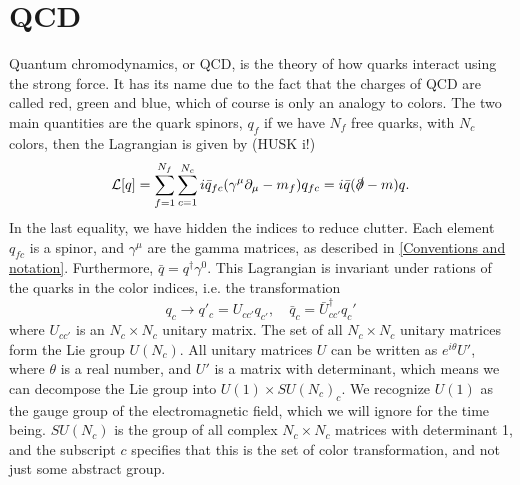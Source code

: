 \section{QCD}

Quantum chromodynamics, or QCD, is the theory of how quarks interact using the strong force.
It has its name due to the fact that the charges of QCD are called red, green and blue, which of course is only an analogy to colors.
The two main quantities are the quark spinors, $q_f$
if we have $N_f$ free quarks, with $N_c$ colors, then the Lagrangian is given by (HUSK i!)
\begin{equation}
    \mathcal{L}[q] = \sum_{f=1}^{N_f} \sum_{c = 1}^{N_c} i \bar q_{fc} (\gamma^\mu \partial_\mu - m_f )q_{fc}
    = i  \bar q (\slashed{\partial } - m)q.
\end{equation}
In the last equality, we have hidden the indices to reduce clutter.
Each element $q_{fc}$ is a spinor, and $\gamma^\mu$ are the gamma matrices, as described in \autoref{Conventions and notation}.
Furthermore, $\bar q = q^\dagger \gamma^0$.
This Lagrangian is invariant under rations of the quarks in the color indices,
i.e. the transformation
\begin{equation}
    q_c \rightarrow q'_c = U_{cc'} q_{c'},
    \quad 
    \bar q_c = \bar U_{cc'}^\dagger q_c'
\end{equation}
where $U_{cc'}$ is an $N_c \times N_c$ unitary matrix.
The set of all $N_c\times N_c$ unitary matrices form the Lie group $U(N_c)$.
All unitary matrices $U$ can be written as $e^{i\theta} U'$, where $\theta$ is a real number, and $U'$ is a matrix with determinant, which means we can decompose the Lie group into $U(1)\times SU(N_c)_c$.
We recognize $U(1)$ as the gauge group of the electromagnetic field, which we will ignore for the time being.
$SU(N_c)$ is the group of all complex $N_c\times N_c$ matrices with determinant 1, and the subscript $c$ specifies that this is the set of color transformation, and not just some abstract group.

